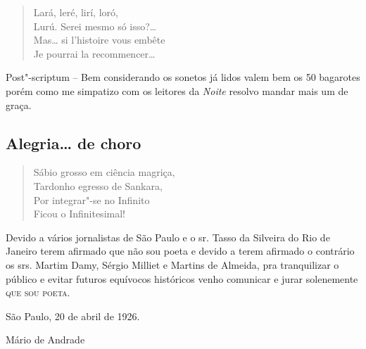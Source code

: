 \begin{verse}
Lará, leré, lirí, loró,\\
Lurú. Serei mesmo só isso?\ldots{}\\
Mas\ldots{} si l'histoire vous embête\\
Je pourrai la recommencer\ldots{}
\end{verse}

\parbox{\textwidth}{
Post"-scriptum -- Bem considerando os sonetos já lidos valem bem os 50
bagarotes porém como me simpatizo com os leitores da \emph{Noite}
resolvo mandar mais um de graça.}


\bigskip
\section*{Alegria\ldots{} de choro}

\begin{verse}
Sábio grosso em ciência magriça,\\
Tardonho egresso de Sankara,\\
Por integrar"-se no Infinito\\
Ficou o Infinitesimal!
\end{verse}


\medskip

\begingroup\centering\parbox{165pt}{
Devido a vários jornalistas de São Paulo e o sr. Tasso da Silveira do
Rio de Janeiro terem afirmado que não sou poeta e devido a terem
afirmado o contrário os srs. Martim Damy, Sérgio Milliet e Martins de
Almeida, pra tranquilizar o público e evitar futuros equívocos
históricos venho comunicar e jurar solenemente \textsc{que sou poeta.}

\hfill{}São Paulo, 20 de abril de 1926.

\hfill{}Mário de Andrade}\endgroup

\chapter[A morte que ri!]{}

